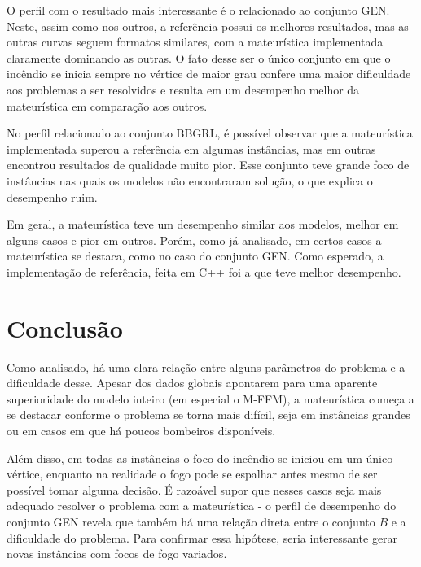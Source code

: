 \documentclass{MO824}
\begin{document}
O perfil com o resultado mais interessante é o relacionado ao conjunto GEN. Neste, assim como nos outros, a referência possui os melhores resultados, mas as outras curvas seguem formatos similares, com a mateurística implementada claramente dominando as outras. O fato desse ser o único conjunto em que o incêndio se inicia sempre no vértice de maior grau confere uma maior dificuldade aos problemas a ser resolvidos e resulta em um desempenho melhor da mateurística em comparação aos outros.

No perfil relacionado ao conjunto BBGRL, é possível observar que a mateurística implementada superou a referência em algumas instâncias, mas em outras encontrou resultados de qualidade muito pior. Esse conjunto teve grande foco de instâncias nas quais os modelos não encontraram solução, o que explica o desempenho ruim.

Em geral, a mateurística teve um desempenho similar aos modelos, melhor em alguns casos e pior em outros. Porém, como já analisado, em certos casos a mateurística se destaca, como no caso do conjunto GEN. Como esperado, a implementação de referência, feita em C++ \cite{nat_dissertation} foi a que teve melhor desempenho. 


\section{Conclusão}

    Como analisado, há uma clara relação entre alguns parâmetros do problema e a dificuldade desse. Apesar dos dados globais apontarem para uma aparente superioridade do modelo inteiro (em especial o M-FFM), a mateurística começa a se destacar conforme o problema se torna mais difícil, seja em instâncias grandes ou em casos em que há poucos bombeiros disponíveis. 

    Além disso, em todas as instâncias o foco do incêndio se iniciou em um único vértice, enquanto na realidade o fogo pode se espalhar antes mesmo de ser possível tomar alguma decisão. É razoável supor que nesses casos seja mais adequado resolver o problema com a mateurística - o perfil de desempenho do conjunto GEN revela que também há uma relação direta entre o conjunto $B$ e a dificuldade do problema. Para confirmar essa hipótese, seria interessante gerar novas instâncias com focos de fogo variados.
    
\end{document}
